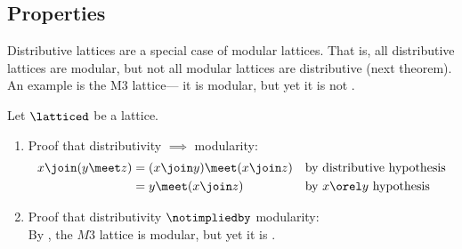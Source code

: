 \subsection{Properties}
Distributive lattices are a special case of modular lattices.
That is, all distributive lattices are modular, but not all
modular lattices are distributive (next theorem).
An example is the M3 lattice---
it is modular, but yet it is not  .
\begin{theorem}
\label{thm:lat_dis=>mod}
Let $\latticed$ be a lattice.
\end{theorem}
\begin{proofns}
\begin{enumerate}
  \item Proof that distributivity $\implies$ modularity:
    \begin{align*}
      x \join (y\meet z)
        &= (x\join y) \meet (x\join z)
        && \text{by distributive hypothesis}
      \\&= y \meet (x\join z)
        && \text{by $x\orel y$ hypothesis}
    \end{align*}

  \item Proof that distributivity $\notimpliedby$ modularity: \\
    By , the $M3$ lattice is modular, but yet it is .
\end{enumerate}
\end{proofns}

